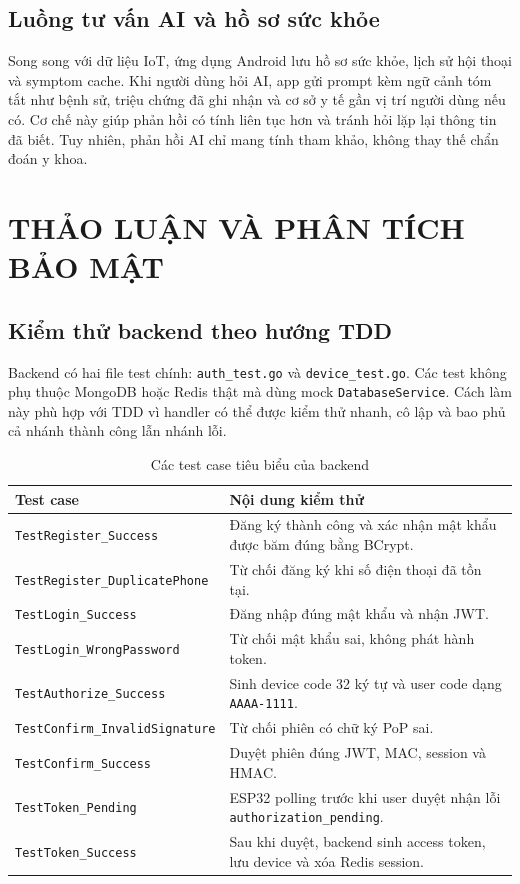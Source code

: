 \documentclass[a4paper,13pt,3p,oneside]{report}
\begin{document}
\section{Luồng tư vấn AI và hồ sơ sức khỏe}
Song song với dữ liệu IoT, ứng dụng Android lưu hồ sơ sức khỏe, lịch sử hội thoại và symptom cache. Khi người dùng hỏi AI, app gửi prompt kèm ngữ cảnh tóm tắt như bệnh sử, triệu chứng đã ghi nhận và cơ sở y tế gần vị trí người dùng nếu có. Cơ chế này giúp phản hồi có tính liên tục hơn và tránh hỏi lặp lại thông tin đã biết. Tuy nhiên, phản hồi AI chỉ mang tính tham khảo, không thay thế chẩn đoán y khoa.
\chapter{THẢO LUẬN VÀ PHÂN TÍCH BẢO MẬT}
\section{Kiểm thử backend theo hướng TDD}
Backend có hai file test chính: \texttt{auth\_test.go} và \texttt{device\_test.go}. Các test không phụ thuộc MongoDB hoặc Redis thật mà dùng mock \texttt{DatabaseService}. Cách làm này phù hợp với TDD vì handler có thể được kiểm thử nhanh, cô lập và bao phủ cả nhánh thành công lẫn nhánh lỗi.

\begin{table}[H]
\centering
\caption{Các test case tiêu biểu của backend}
\renewcommand{\arraystretch}{1.15}
\setlength{\tabcolsep}{6pt}
\begin{tabularx}{\textwidth}{p{7.5cm}X}
\toprule
\textbf{Test case} & \textbf{Nội dung kiểm thử} \\
\midrule
\texttt{TestRegister\_Success} & Đăng ký thành công và xác nhận mật khẩu được băm đúng bằng BCrypt. \\
\texttt{TestRegister\_DuplicatePhone} & Từ chối đăng ký khi số điện thoại đã tồn tại. \\
\texttt{TestLogin\_Success} & Đăng nhập đúng mật khẩu và nhận JWT. \\
\texttt{TestLogin\_WrongPassword} & Từ chối mật khẩu sai, không phát hành token. \\
\texttt{TestAuthorize\_Success} & Sinh device code 32 ký tự và user code dạng \texttt{AAAA-1111}. \\
\texttt{TestConfirm\_InvalidSignature} & Từ chối phiên có chữ ký PoP sai. \\
\texttt{TestConfirm\_Success} & Duyệt phiên đúng JWT, MAC, session và HMAC. \\
\texttt{TestToken\_Pending} & ESP32 polling trước khi user duyệt nhận lỗi \texttt{authorization\_pending}. \\
\texttt{TestToken\_Success} & Sau khi duyệt, backend sinh access token, lưu device và xóa Redis session. \\
\bottomrule
\end{tabularx}
\end{table}
\end{document}
